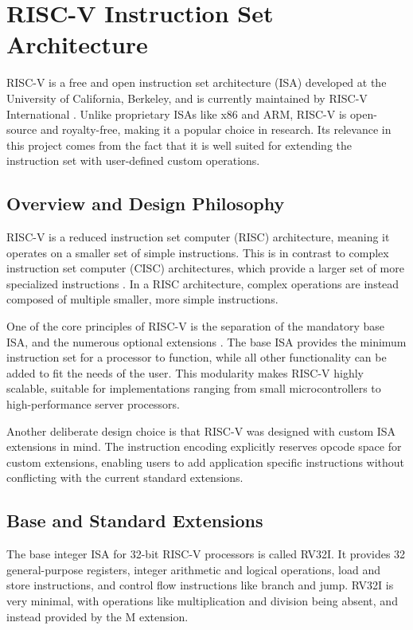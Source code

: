 \newpage
\section{RISC-V Instruction Set Architecture}
\label{sec:riscv}

RISC-V is a free and open instruction set architecture (ISA) developed at the University of California, Berkeley, and is currently maintained by RISC-V International \cite{AsanovicPatterson2014}. Unlike proprietary ISAs like x86 and ARM, RISC-V is open-source and royalty-free, making it a popular choice in research. Its relevance in this project comes from the fact that it is well suited for extending the instruction set with user-defined custom operations.

\subsection{Overview and Design Philosophy}
\label{sec:riscv_overview}
RISC-V is a reduced instruction set computer (RISC) architecture, meaning it operates on a smaller set of simple instructions. This is in contrast to complex instruction set computer (CISC) architectures, which provide a larger set of more specialized instructions \cite{patterson1980risc}. In a RISC architecture, complex operations are instead composed of multiple smaller, more simple instructions.

One of the core principles of RISC-V is the separation of the mandatory base ISA, and the numerous optional extensions \cite{AsanovicPatterson2014,riscv_unpriv_isa}. The base ISA provides the minimum instruction set for a processor to function, while all other functionality can be added to fit the needs of the user. This modularity makes RISC-V highly scalable, suitable for implementations ranging from small microcontrollers to high-performance server processors.

Another deliberate design choice is that RISC-V was designed with custom ISA extensions in mind. The instruction encoding explicitly reserves opcode space for custom extensions, enabling users to add application specific instructions without conflicting with the current standard extensions.

\subsection{Base and Standard Extensions}
\label{sec:riscv_extensions}
The base integer ISA for 32-bit RISC-V processors is called RV32I. It provides 32 general-purpose registers, integer arithmetic and logical operations, load and store instructions, and control flow instructions like branch and jump. RV32I is very minimal, with operations like multiplication and division being absent, and instead provided by the M extension. 

